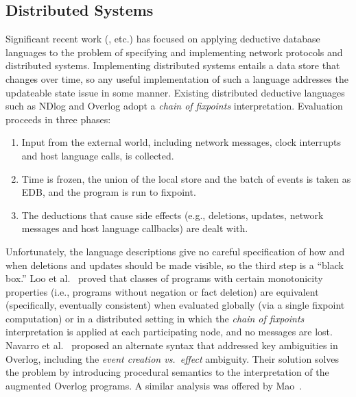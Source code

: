 \subsection{Distributed Systems}

Significant recent work
(\cite{boom-eurosys,Belaramani:2009,Chu:2007,Loo2009-CACM}, etc.) has focused on
applying deductive database languages to the problem of specifying and
implementing network protocols and distributed systems.  Implementing
distributed systems entails a data store that changes over time, so any useful
implementation of such a language addresses the updateable state issue in some
manner.  Existing distributed deductive languages such as NDlog and Overlog
adopt a \emph{chain of fixpoints} interpretation. Evaluation proceeds in three
phases:

\begin{enumerate}
\item Input from the external world, including network messages, clock interrupts and host language calls, is collected.
\item Time is frozen, the union of the local store and the batch of events is taken as EDB, and the program is run to fixpoint.
\item The deductions that cause side effects (e.g., deletions, updates, network messages and host language callbacks) are dealt with.  
\end{enumerate}

Unfortunately, the language descriptions give no careful specification of how and when deletions and updates
should be made visible, so the third step is a ``black box.''  Loo et al.~\cite{Loo2009-CACM} proved that classes of programs with certain 
monotonicity properties (i.e., programs without negation or fact deletion)
are equivalent (specifically, eventually consistent) when evaluated globally (via a single fixpoint computation) or in a distributed setting in which the 
\emph{chain of fixpoints} interpretation is applied at each participating node, and no messages are lost.
Navarro et al.~\cite{navarro} proposed an alternate syntax that addressed key ambiguities in Overlog, including the
\emph{event creation vs.\ effect} ambiguity.  Their solution solves the problem by introducing procedural semantics to the interpretation of 
the augmented Overlog programs.  A similar analysis was offered by Mao~\cite{Mao2009}.


